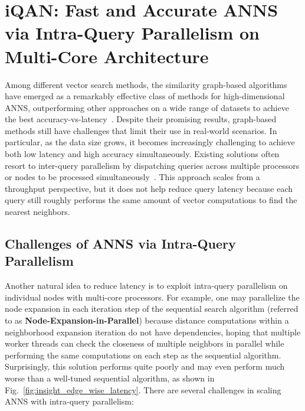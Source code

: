 \section{iQAN: Fast and Accurate ANNS via Intra-Query Parallelism on Multi-Core Architecture}
\label{sec:iqan}

Among different vector search methods, the similarity graph-based algorithms have emerged as a remarkably effective class of methods for high-dimensional ANNS, outperforming other approaches on a wide range of datasets to achieve the best accuracy-vs-latency~\cite{nsg,ann-benchmark,li2020approximate,echihabi2019return,wei2020analyticdb,wang2020deltapq,product-quantization,babenko2014inverted}. Despite their promising results, graph-based methods still have challenges that limit their use in real-world scenarios.
In particular, as the data size grows, it becomes increasingly challenging to achieve both low latency and high accuracy simultaneously. Existing solutions often resort to inter-query parallelism by dispatching queries across multiple processors or nodes to be processed simultaneously~\cite{nsg,bashyam2020fast}. This approach scales from a throughput perspective, but it does not help reduce query latency because each query still roughly performs the same amount of vector computations to find the nearest neighbors.

\subsection{Challenges of ANNS via Intra-Query Parallelism}

Another natural idea to reduce latency is to exploit intra-query parallelism on individual nodes with multi-core processors. For example, one may parallelize the node expansion in each iteration step of the sequential search algorithm (referred to as \textbf{Node-Expansion-in-Parallel}) because distance computations within a neighborhood expansion iteration do not have dependencies, hoping that multiple worker threads can check the closeness of multiple neighbors in parallel while performing the same computations on each step as the sequential algorithm.  Surprisingly, this solution performs quite poorly and may even perform much worse than a well-tuned sequential algorithm, as shown in Fig.~\ref{fig:insight_edge_wise_latency}. There are several challenges in scaling ANNS with intra-query parallelism:

